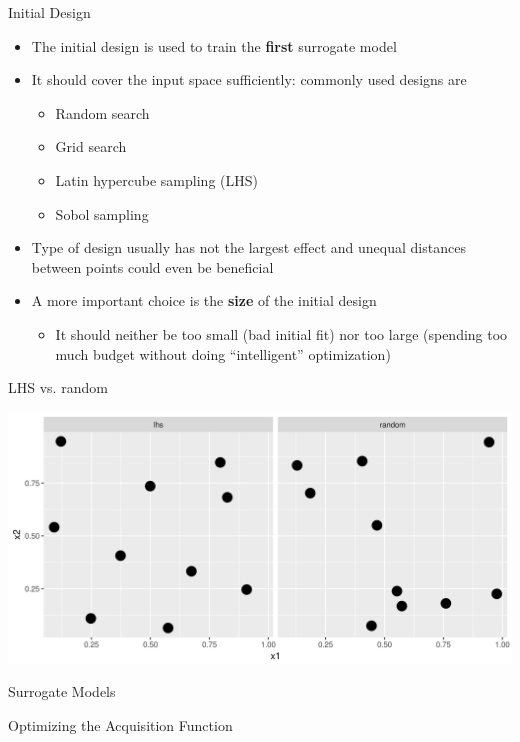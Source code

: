 \documentclass[11pt,compress,t,notes=noshow, xcolor=table]{beamer}
\begin{document}
\begin{vbframe}{Initial Design}

\begin{itemize}
\item The initial design is used to train the \textbf{first} surrogate model
\item It should cover the input space sufficiently: commonly used designs are
\begin{itemize}
  \item Random search
  \item Grid search
  \item Latin hypercube sampling (LHS)
  \item Sobol sampling
\end{itemize}
\item Type of design usually has not the largest effect and unequal distances between points could even be beneficial
\item A more important choice is the \textbf{size} of the initial design
\begin{itemize}
  \item It should neither be too small (bad initial fit) nor too large (spending too much budget without doing \enquote{intelligent} optimization)
\end{itemize}
\end{itemize}

\framebreak

LHS vs. random

\begin{center}
\includegraphics[width=\textwidth]{figure_man/initdes.png}  %
\end{center}

\end{vbframe}

\begin{vbframe}{Surrogate Models}

\end{vbframe}

\begin{vbframe}{Optimizing the Acquisition Function}

\end{vbframe}

\endlecture
\end{document}
